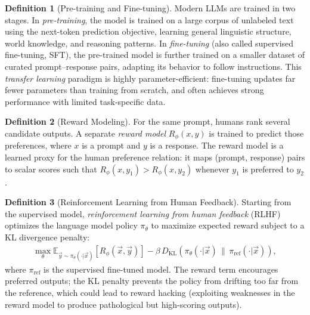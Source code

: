 \documentclass[11pt]{article}
\theoremstyle{definition}
\newtheorem{definition}{Definition}[section]
\theoremstyle{plain}
\theoremstyle{remark}
\begin{document}
\begin{definition}[Pre-training and Fine-tuning]
    Modern LLMs are trained in two stages. In \emph{pre-training}, the model is trained on a large corpus of unlabeled text using the next-token prediction objective, learning general linguistic structure, world knowledge, and reasoning patterns. In \emph{fine-tuning} (also called supervised fine-tuning, SFT), the pre-trained model is further trained on a smaller dataset of curated prompt--response pairs, adapting its behavior to follow instructions. This \emph{transfer learning} paradigm is highly parameter-efficient: fine-tuning updates far fewer parameters than training from scratch, and often achieves strong performance with limited task-specific data.
\end{definition}

\begin{definition}[Reward Modeling]
    For the same prompt, humans rank several candidate outputs. A separate \emph{reward model} $R_\phi(x, y)$ is trained to predict those preferences, where $x$ is a prompt and $y$ is a response. The reward model is a learned proxy for the human preference relation: it maps (prompt, response) pairs to scalar scores such that $R_\phi(x, y_1) > R_\phi(x, y_2)$ whenever $y_1$ is preferred to $y_2$.
\end{definition}

\begin{definition}[Reinforcement Learning from Human Feedback]
    Starting from the supervised model, \emph{reinforcement learning from human feedback} (RLHF) optimizes the language model policy $\pi_\theta$ to maximize expected reward subject to a KL divergence penalty:
    \begin{align}
        \max_\theta \mathbb{E}_{\vec{y} \sim \pi_\theta(\cdot|\vec{x})}\!\left[R_\phi(\vec{x}, \vec{y})\right] - \beta \, D_{\text{KL}}\!\left(\pi_\theta(\cdot|\vec{x}) \,\|\, \pi_{\text{ref}}(\cdot|\vec{x})\right),
    \end{align}
    where $\pi_{\text{ref}}$ is the supervised fine-tuned model. The reward term encourages preferred outputs; the KL penalty prevents the policy from drifting too far from the reference, which could lead to reward hacking (exploiting weaknesses in the reward model to produce pathological but high-scoring outputs).
\end{definition}
\end{document}
